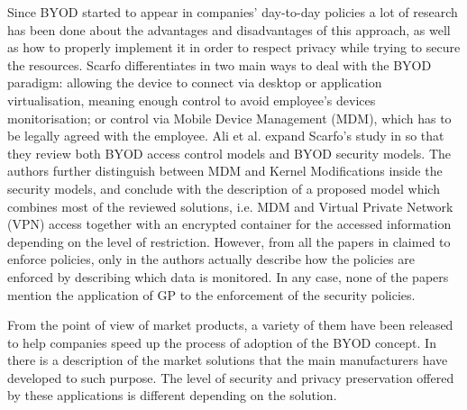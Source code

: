 \documentclass[a4paper,10pt,twocolumn,preprint,3p]{elsarticle}
\begin{document}
Since BYOD started to appear in companies' day-to-day policies  a lot
of research has been done about the advantages and disadvantages of
this approach, as well as how to properly implement it in order to
respect privacy while trying to secure the resources. %
 Scarfo differentiates in \cite{scarfo2012new} two main ways to deal with the BYOD paradigm: allowing the device to connect via desktop or application virtualisation, meaning enough control to avoid employee's devices monitorisation; or control via Mobile Device Management (MDM), which has to be legally agreed with the employee. Ali et al. expand Scarfo's study in \cite{ali2015analysis} so that they review both BYOD access control models and BYOD security models. The authors further distinguish between MDM and Kernel Modifications inside the security models, and conclude with the description of a proposed model which combines most of the reviewed solutions, i.e. MDM and Virtual Private Network (VPN) access together with an encrypted container for the accessed information depending on the level of restriction. However, from all the papers in \cite{ali2015analysis} claimed to enforce policies, only in \cite{rhee2013high} the authors actually describe how the policies are enforced by describing which data is monitored. In any case, none of the papers mention the application of GP to the enforcement of the security policies.

From the point of view of market products, a variety of them have been released to help companies speed up the process of adoption of the BYOD concept. In \cite{de2015corporate} there is a description of the market solutions that the main manufacturers have developed to such purpose. The level of security and privacy preservation offered by these applications is different depending on the solution.
\end{document}
